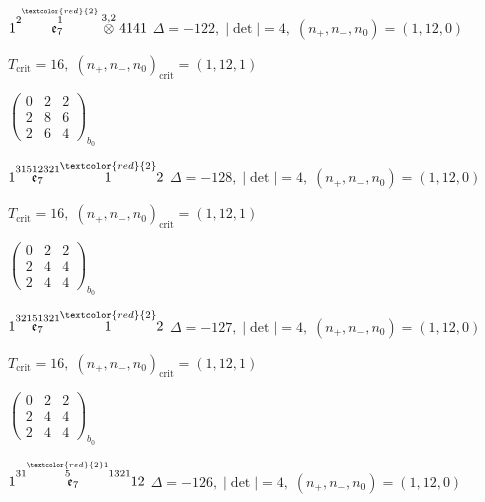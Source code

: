 \documentclass[10pt]{article}
\begin{document}
\smallskip

$1\overset{2\overset{\textcolor{red}{2}}{1}}{\mathfrak{e}_7}\overset{3,2}{\otimes}4141$ \quad $\Delta=-122,\; |\det|=4,\; (n_+,n_-,n_0)=(1,12,0)$

\hspace{1em}$T_{\text{crit}}=16,\; (n_+,n_-,n_0)_{\text{crit}}=(1,12,1)$

\hspace{2em}$\left(\begin{smallmatrix}0 & 2 & 2 \\ 2 & 8 & 6 \\ 2 & 6 & 4\end{smallmatrix}\right)_{\!b_0}$

\smallskip

$1\overset{31512321}{\mathfrak{e}_7}\overset{\textcolor{red}{2}}{1}2$ \quad $\Delta=-128,\; |\det|=4,\; (n_+,n_-,n_0)=(1,12,0)$

\hspace{1em}$T_{\text{crit}}=16,\; (n_+,n_-,n_0)_{\text{crit}}=(1,12,1)$

\hspace{2em}$\left(\begin{smallmatrix}0 & 2 & 2 \\ 2 & 4 & 4 \\ 2 & 4 & 4\end{smallmatrix}\right)_{\!b_0}$

\smallskip

$1\overset{32151321}{\mathfrak{e}_7}\overset{\textcolor{red}{2}}{1}2$ \quad $\Delta=-127,\; |\det|=4,\; (n_+,n_-,n_0)=(1,12,0)$

\hspace{1em}$T_{\text{crit}}=16,\; (n_+,n_-,n_0)_{\text{crit}}=(1,12,1)$

\hspace{2em}$\left(\begin{smallmatrix}0 & 2 & 2 \\ 2 & 4 & 4 \\ 2 & 4 & 4\end{smallmatrix}\right)_{\!b_0}$

\smallskip

$1\overset{31\overset{\textcolor{red}{2}1}{5}1321}{\mathfrak{e}_7}12$ \quad $\Delta=-126,\; |\det|=4,\; (n_+,n_-,n_0)=(1,12,0)$
\end{document}
